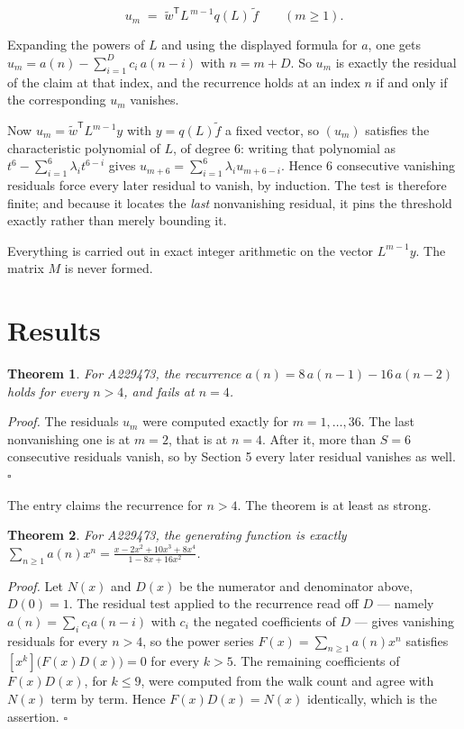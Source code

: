 \documentclass[11pt]{article}
\newtheorem{theorem}{Theorem}
\theoremstyle{definition}
\begin{document}
\[u_m \;=\; \tilde w^{\mathsf T} L^{\,m-1} q(L)\,\tilde f \qquad (m \ge 1).\]

Expanding the powers of $L$ and using the displayed formula for $a$, one gets $u_m = a(n) - \sum_{i=1}^{D} c_i\,a(n-i)$ with $n = m + D$. So $u_m$ is exactly the residual of the claim at that index, and the recurrence holds at an index $n$ if and only if the corresponding $u_m$ vanishes.

Now $u_m = \tilde w^{\mathsf T} L^{m-1} y$ with $y = q(L)\tilde f$ a fixed vector, so $(u_m)$ satisfies the characteristic polynomial of $L$, of degree $6$: writing that polynomial as $t^{6} - \sum_{i=1}^{6} \lambda_i t^{6-i}$ gives $u_{m+6} = \sum_{i=1}^{6} \lambda_i u_{m+6-i}$. Hence $6$ consecutive vanishing residuals force every later residual to vanish, by induction. The test is therefore finite; and because it locates the {\itshape last} nonvanishing residual, it pins the threshold exactly rather than merely bounding it.

Everything is carried out in exact integer arithmetic on the vector $L^{m-1}y$. The matrix $M$ is never formed.

\section{Results}

\begin{theorem} For A229473, the recurrence $a(n) = 8\,a(n-1) - 16\,a(n-2)$ holds for every $n > 4$, and fails at $n = 4$.\end{theorem}

{\itshape Proof.} The residuals $u_m$ were computed exactly for $m = 1,\dots,36$. The last nonvanishing one is at $m = 2$, that is at $n = 4$. After it, more than $S = 6$ consecutive residuals vanish, so by Section 5 every later residual vanishes as well. $\square$

The entry claims the recurrence for $n > 4$. The theorem is at least as strong.

\begin{theorem} For A229473, the generating function is exactly $\sum_{n\ge 1} a(n)x^n = \frac{x - 2x^{2} + 10x^{3} + 8x^{4}}{1 - 8x + 16x^{2}}$.\end{theorem}

{\itshape Proof.} Let $N(x)$ and $D(x)$ be the numerator and denominator above, $D(0)=1$. The residual test applied to the recurrence read off $D$ --- namely $a(n) = \sum_i c_i a(n-i)$ with $c_i$ the negated coefficients of $D$ --- gives vanishing residuals for every $n > 4$, so the power series $F(x)=\sum_{n\ge 1}a(n)x^n$ satisfies $[x^k]\bigl(F(x)D(x)\bigr) = 0$ for every $k > 5$. The remaining coefficients of $F(x)D(x)$, for $k \le 9$, were computed from the walk count and agree with $N(x)$ term by term. Hence $F(x)D(x) = N(x)$ identically, which is the assertion. $\square$
\end{document}
